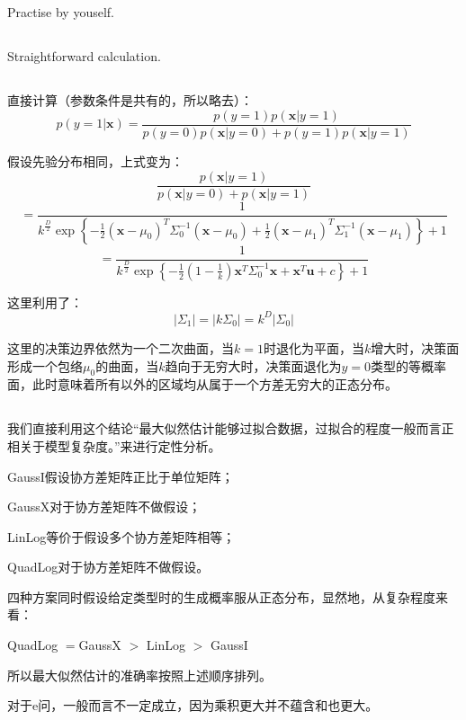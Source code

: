 \documentclass[UTF8]{ctexart}
\begin{document}
\subsection{}
Practise by youself.

\subsection{}
Straightforward calculation.

\subsection{}
直接计算（参数条件是共有的，所以略去）：
$$p(y=1|\textbf{x}) = \frac{p(y=1)p(\textbf{x}|y=1)}{p(y=0)p(\textbf{x}|y=0)+p(y=1)p(\textbf{x}|y=1)}$$

假设先验分布相同，上式变为：
$$\frac{p(\textbf{x}|y=1)}{p(\textbf{x}|y=0)+p(\textbf{x}|y=1)}$$
$$=\frac{1}{k^{\frac{D}{2}}\exp\left\{-\frac{1}{2}(\textbf{x}-\mu_{0})^{T}\Sigma_{0}^{-1}(\textbf{x}-\mu_{0}) +\frac{1}{2} (\textbf{x}-\mu_{1})^{T}\Sigma_{1}^{-1}(\textbf{x}-\mu_{1}) \right\}+ 1}$$
$$=\frac{1}{k^{\frac{D}{2}}\exp\left\{ -\frac{1}{2}(1-\frac{1}{k})\textbf{x}^{T}\Sigma_{0}^{-1}\textbf{x}+\textbf{x}^{T}\textbf{u}+c \right\} + 1}$$

这里利用了：
$$|\Sigma_{1}|=|k\Sigma_{0}|=k^{D}|\Sigma_{0}|$$

这里的决策边界依然为一个二次曲面，当$k=1$时退化为平面，当$k$增大时，决策面形成一个包络$\mu_{0}$的曲面，当$k$趋向于无穷大时，决策面退化为$y=0$类型的等概率面，此时意味着所有以外的区域均从属于一个方差无穷大的正态分布。

\subsection{}
我们直接利用这个结论“最大似然估计能够过拟合数据，过拟合的程度一般而言正相关于模型复杂度。”来进行定性分析。

GaussI假设协方差矩阵正比于单位矩阵；

GaussX对于协方差矩阵不做假设；

LinLog等价于假设多个协方差矩阵相等；

QuadLog对于协方差矩阵不做假设。

四种方案同时假设给定类型时的生成概率服从正态分布，显然地，从复杂程度来看：

QuadLog $=$GaussX $>$ LinLog $>$ GaussI

所以最大似然估计的准确率按照上述顺序排列。

对于e问，一般而言不一定成立，因为乘积更大并不蕴含和也更大。
\end{document}
